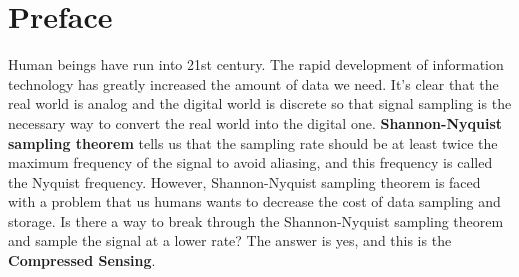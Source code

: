 \documentclass[12pt]{ctexart}
\begin{document}
\begin{titlepage}
    \centering
    \vspace*{96pt}
    \fontsize{26}{31.2}\selectfont{Introdution to Compressed Sensing}\par %
    \vspace{39pt}
    \fontsize{22}{26.4}\selectfont{\haettenfont v1 .0\normalfont}\par %
    \vspace{52.8pt}
    \fontsize{18}{21.6}\par %
    \fontsize{18}{21.6}\selectfont{Last Edited on: Jul 30th, 2025}\par %
    \vfill
\end{titlepage}

\newpage
\thispagestyle{empty}
\small
\tableofcontents
\newpage
\setcounter{page}{1}

\fancyhf{}
\fancyhead[C]{ }
\fancyfoot[C]{\bfseries\thepage}

\newpage
\titleformat{\section}[block]{\normalfont\Large\bfseries\centering}{}{0pt}{}
\section*{\textbf{Preface}}

Human beings have run into 21st century. The rapid development of information technology
has greatly increased the amount of data we need. It's clear that the real world is analog
and the digital world is discrete so that signal sampling is the necessary way to convert
the real world into the digital one. \textbf{Shannon-Nyquist sampling theorem} tells us
that the sampling rate should be at least twice the maximum frequency of the signal to
avoid aliasing, and this frequency is called the Nyquist frequency. However,
Shannon-Nyquist sampling theorem is faced with a problem that us humans wants to decrease
the cost of data sampling and storage. Is there a way to break through the
Shannon-Nyquist sampling theorem and sample the signal at a lower rate? The answer is yes,
and this is the \textbf{Compressed Sensing}.
\end{document}
